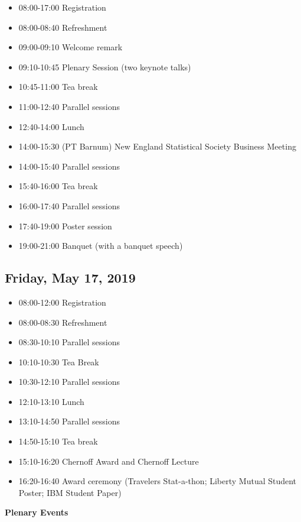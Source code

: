 \documentclass[10pt]{article}
\begin{document}
\begin{itemize}
\item
  08:00-17:00 \hfill Registration
\item
  08:00-08:40 \hfill Refreshment
\item
  09:00-09:10 \hfill Welcome remark
\item
  09:10-10:45 \hfill Plenary Session (two keynote talks)
\item
  10:45-11:00 \hfill Tea break
\item
  11:00-12:40 \hfill Parallel sessions
\item
  12:40-14:00 \hfill Lunch
\item
  14:00-15:30 (PT Barnum) \hfill New England Statistical Society Business Meeting
\item
  14:00-15:40 \hfill Parallel sessions
\item
  15:40-16:00 \hfill Tea break
\item
  16:00-17:40 \hfill Parallel sessions
\item
  17:40-19:00 \hfill Poster session
\item
  19:00-21:00 \hfill Banquet (with a banquet speech)
\end{itemize}

\vfill
\subsection*{Friday, May 17, 2019}

\begin{itemize}
\item
  08:00-12:00 \hfill Registration
\item 
  08:00-08:30 \hfill Refreshment
\item
  08:30-10:10 \hfill Parallel sessions
\item
  10:10-10:30 \hfill Tea Break
\item
  10:30-12:10 \hfill Parallel sessions
\item
  12:10-13:10 \hfill Lunch
\item
  13:10-14:50 \hfill Parallel sessions
\item
  14:50-15:10 \hfill Tea break
\item
  15:10-16:20 \hfill Chernoff Award and Chernoff Lecture
\item
  16:20-16:40 \hfill Award ceremony (Travelers Stat-a-thon; Liberty Mutual
  Student Poster; IBM Student Paper)
\end{itemize}

\clearpage
{}
\begin{center}
  {\bf\Huge Plenary Events}
\end{center}
\end{document}
